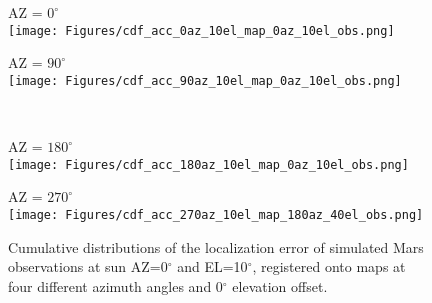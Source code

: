 \begin{figure}
\centering
\begin{minipage}[b]{0.49\linewidth}
    \centering
    AZ = $0^{\circ}$
    \vspace{5pt} \\
    \texttt{[image: Figures/cdf\_acc\_0az\_10el\_map\_0az\_10el\_obs.png]}
\end{minipage}
\begin{minipage}[b]{0.49\linewidth}
    \centering
    AZ = $90^{\circ}$
    \vspace{5pt} \\
    \texttt{[image: Figures/cdf\_acc\_90az\_10el\_map\_0az\_10el\_obs.png]}
\end{minipage}
\\
\vspace{10pt}
\begin{minipage}[b]{0.49\linewidth}
    \centering
    AZ = $180^{\circ}$
    \vspace{5pt} \\
    \texttt{[image: Figures/cdf\_acc\_180az\_10el\_map\_0az\_10el\_obs.png]}
\end{minipage}
\begin{minipage}[b]{0.49\linewidth}
    \centering
    AZ = $270^{\circ}$
    \vspace{5pt} \\
    \texttt{[image: Figures/cdf\_acc\_270az\_10el\_map\_180az\_40el\_obs.png]}
\end{minipage}
\vspace{-10pt}
\caption{\label{fig:cdf_sun_az_var}Cumulative distributions of the localization error of simulated Mars observations at sun AZ=0$^{\circ}$ and EL=10$^{\circ}$, registered onto maps at four different azimuth angles and 0$^{\circ}$ elevation offset.}
\end{figure}

